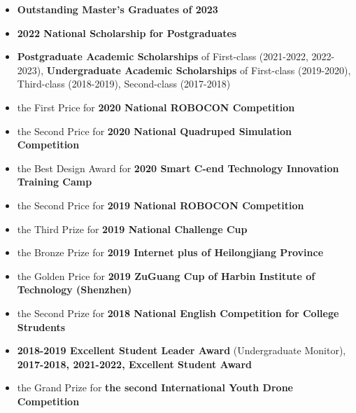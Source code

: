 %
%




\begin{itemize}

    \item{\textbf{Outstanding Master's Graduates of 2023}}
    \item {\textbf{2022 National Scholarship for Postgraduates}}

    \item{\textbf{Postgraduate Academic Scholarships} of First-class (2021-2022, 2022-2023)}, {\textbf{Undergraduate Academic Scholarships} of First-class (2019-2020), Third-class (2018-2019), Second-class (2017-2018)}
    
    \item{the First Price for \textbf{2020 National ROBOCON Competition}}
    \item{the Second Price for \textbf{2020 National Quadruped Simulation Competition}}
    \item {the Best Design Award for \textbf{2020 Smart C-end Technology Innovation Training Camp}}
    
    \item{the Second Price for \textbf{2019 National ROBOCON Competition}}
    
    \item{the Third Prize for \textbf{2019 National Challenge Cup}}
    
    \item{the Bronze Prize for \textbf{2019 Internet plus of Heilongjiang Province}}
    \item{the Golden Price for \textbf{2019 ZuGuang Cup of Harbin Institute of Technology (Shenzhen)}}
    
    \item{the Second Prize for \textbf{2018 National English Competition for College Strudents}}
    \item {\textbf{2018-2019 Excellent Student Leader Award} (Undergraduate Monitor), \textbf{2017-2018, 2021-2022, Excellent Student Award}}
    
    \item{the Grand Prize for \textbf{the second International Youth Drone Competition}}
\end{itemize}

